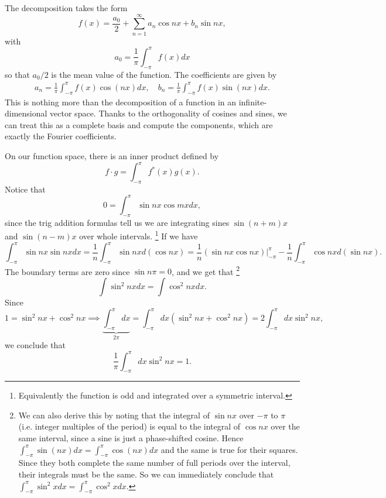 The decomposition takes the form
\begin{equation}
    f(x) = \frac{a_0}{2} + \sum_{n=1}^\infty a_n \cos n x + b_n \sin nx,
\end{equation}
with
\begin{equation}
    a_0 = \frac{1}{\pi} \int_{-\pi}^\pi f(x) dx
\end{equation}
so that $a_0/2$ is the mean value of the function. The coefficients are given by
\begin{align}
    a_n = \frac{1}{\pi} \int_{-\pi}^\pi f(x) \cos(nx) dx, \quad b_n = \frac{1}{\pi} \int_{-\pi}^\pi f(x) \sin(nx) dx.
\end{align}
This is nothing more than the decomposition of a function in an infinite-dimensional vector space. Thanks to the orthogonality of cosines and sines, we can treat this as a complete basis and compute the components, which are exactly the Fourier coefficients.

On our function space, there is an inner product defined by
\begin{equation}
    f\cdot g = \int_{-\pi}^\pi f^*(x) g(x).
\end{equation}
Notice that 
\begin{equation}
     0 = \int_{-\pi}^\pi \sin nx \cos mx dx,
\end{equation}
since the trig addition formulas tell us we are integrating sines $\sin(n+m)x$ and $\sin(n-m)x$ over whole intervals.%
    \footnote{Equivalently the function is odd and integrated over a symmetric interval.}
If we have
\begin{equation}
    \int_{-\pi}^\pi \sin n x \sin nx dx = \frac{1}{n} \int_{-\pi}^\pi \sin nx d(\cos nx) = \frac{1}{n} (\sin nx \cos nx)|_{-\pi}^\pi - \frac{1}{n} \int_{-\pi}^\pi \cos n x d
    (\sin nx).
\end{equation}
The boundary terms are zero since $\sin n\pi=0$, and we get that%
    \footnote{We can also derive this by noting that the integral of $\sin nx$ over $-\pi$ to $\pi$ (i.e. integer multiples of the period) is equal to the integral of $\cos nx$ over the same interval, since a sine is just a phase-shifted cosine. Hence $\int_{-\pi}^\pi \sin(nx) dx = \int_{-\pi}^\pi \cos(nx) dx$ and the same is true for their squares. Since they both complete the same number of full periods over the interval, their integrals must be the same. So we can immediately conclude that $\int_{-\pi}^\pi \sin^2 x dx = \int_{-\pi}^\pi \cos^2 x dx.$}
\begin{equation}
    \int \sin^2 nx dx = \int \cos^2 nx dx.
\end{equation}
Since
\begin{equation}
    1 = \sin^2 nx + \cos^2 nx \implies \underbrace{\int_{-\pi}^\pi dx}_{2\pi} = \int_{-\pi}^\pi dx (\sin^2 nx + \cos^2 nx) = 2\int_{-\pi}^\pi dx \sin^2 nx,
\end{equation}
we conclude that
\begin{equation}
    \frac{1}{\pi} \int_{-\pi}^\pi dx \sin^2 nx = 1.
\end{equation}

